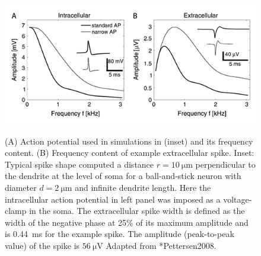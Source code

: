 \begin{figure}[!ht]
\begin{center}
\includegraphics{Figures/Spikes/Spikes-ball-and-stick-frequency-w90-r150}
\end{center}
\caption[]{(A) Action potential used in simulations in (inset) 
and its frequency content.
(B) Frequency content of example extracellular spike. Inset: Typical spike shape computed a distance $r=10~\si{\micro\metre}$ perpendicular to the dendrite at the level of soma for a ball-and-stick neuron with diameter $d=2~\si{\micro\metre}$ and infinite dendrite length. Here the intracellular action potential in left panel was imposed as a voltage-clamp in the soma.
The extracellular spike width is defined as the width of the negative phase at 25\% of its maximum
amplitude and is 0.44~ms for the example spike. The amplitude (peak-to-peak value) of the spike is $56~\si{\micro\volt}$  
  Adapted from \citeasnoun**{Pettersen2008}.}
 
\label{fig:Spikes:ball-and-stick-frequency}
\end{figure}

%

